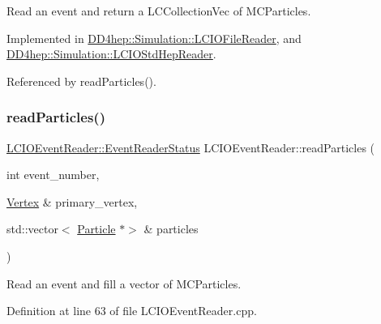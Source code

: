 Read an event and return a L\+C\+Collection\+Vec of M\+C\+Particles. 



Implemented in \hyperlink{class_d_d4hep_1_1_simulation_1_1_l_c_i_o_file_reader_a4163f75ac06423136ab2c3e806713b83}{D\+D4hep\+::\+Simulation\+::\+L\+C\+I\+O\+File\+Reader}, and \hyperlink{class_d_d4hep_1_1_simulation_1_1_l_c_i_o_std_hep_reader_ab358476ce7a1bab27504d2bfe4b8b630}{D\+D4hep\+::\+Simulation\+::\+L\+C\+I\+O\+Std\+Hep\+Reader}.



Referenced by read\+Particles().

\hypertarget{class_d_d4hep_1_1_simulation_1_1_l_c_i_o_event_reader_afe9e5f8fdd76cb4cd1a3a3bd85b72d75}{}\label{class_d_d4hep_1_1_simulation_1_1_l_c_i_o_event_reader_afe9e5f8fdd76cb4cd1a3a3bd85b72d75} 
\subsubsection{\texorpdfstring{read\+Particles()}{readParticles()}}
{\footnotesize\ttfamily \hyperlink{class_d_d4hep_1_1_simulation_1_1_geant4_event_reader_ae4f4bc83ffcf5b0c1868ad78859851e7}{L\+C\+I\+O\+Event\+Reader\+::\+Event\+Reader\+Status} L\+C\+I\+O\+Event\+Reader\+::read\+Particles (\begin{DoxyParamCaption}\item[{int}]{event\+\_\+number,  }\item[{\hyperlink{class_d_d4hep_1_1_simulation_1_1_geant4_event_reader_ac9738208fe520e5aa2ad1efa13de82e7}{Vertex} \&}]{primary\+\_\+vertex,  }\item[{std\+::vector$<$ \hyperlink{class_d_d4hep_1_1_simulation_1_1_geant4_event_reader_ad37f7aa722da2299517d66b4568a6a4a}{Particle} $\ast$$>$ \&}]{particles }\end{DoxyParamCaption})\hspace{0.3cm}{\ttfamily [virtual]}}



Read an event and fill a vector of M\+C\+Particles. 



Definition at line 63 of file L\+C\+I\+O\+Event\+Reader.\+cpp.



